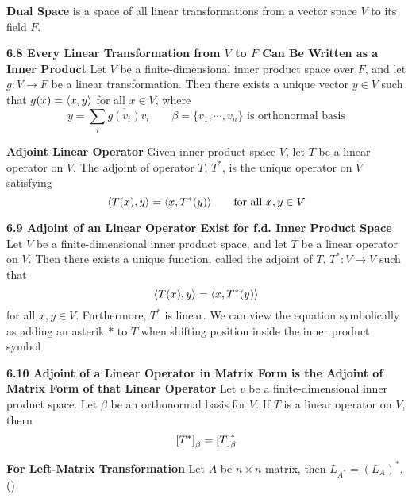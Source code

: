 \documentclass[11pt]{article}
\begin{document}

\begin{defn*}
    \textbf{Dual Space} is a space of all linear transformations from a vector space $V$ to its field $F$. 
\end{defn*}

\begin{theorem*}
    \textbf{6.8 Every Linear Transformation from $V$ to $F$ Can Be Written as a Inner Product} Let $V$ be a finite-dimensional inner product space over $F$, and let $g: V\to F$ be a linear transformation. Then there exists a unique vector $y\in V$ such that $g(x) = \langle x,y\rangle$ for all $x\in V$, where
    \[
        y = \sum_i \overline{g(v_i)} v_i \qquad \text{$\beta = \{ v_1,\cdots , v_n \}$ is orthonormal basis}
    \]
\end{theorem*}


\begin{defn*}
    \textbf{Adjoint Linear Operator} Given inner product space $V$, let $T$ be a linear operator on $V$. The adjoint of operator $T$, $T^*$, is the unique operator on $V$ satisfying 
    \[
        \langle T(x),y\rangle = \langle x,T^*(y)\rangle    
        \qquad \text{for all $x,y\in V$}
    \]
\end{defn*}

\begin{theorem*}
    \textbf{6.9 Adjoint of an Linear Operator Exist for f.d. Inner Product Space} Let $V$ be a finite-dimensional inner product space, and let $T$ be a linear operator on $V$. Then there exists a unique function, called the adjoint of $T$, $T^*: V\to V$ such that
    \[
        \langle T(x),y\rangle = \langle x,T^*(y)\rangle    
    \]
    for all $x,y\in V$. Furthermore, $T^*$ is linear. We can view the equation symbolically as adding an asterik $*$ to $T$  when shifting position inside the inner product symbol
\end{theorem*}



\begin{theorem*}
    \textbf{6.10 Adjoint of a Linear Operator in Matrix Form is the Adjoint of Matrix Form of that Linear Operator} Let $v$ be a finite-dimensional inner product space. Let $\beta$ be an orthonormal basis for $V$. If $T$ is a linear operator on $V$, thern 
    \[
        \left[ T^* \right]_{\beta} = \left[ T \right]_{\beta}^*
    \]
\end{theorem*}

\begin{corollary*}
    \textbf{For Left-Matrix Transformation} Let $A$ be $n\times n$ matrix, then $L_{A^*} = (L_A)^*$. ()
\end{corollary*}
\end{document}
